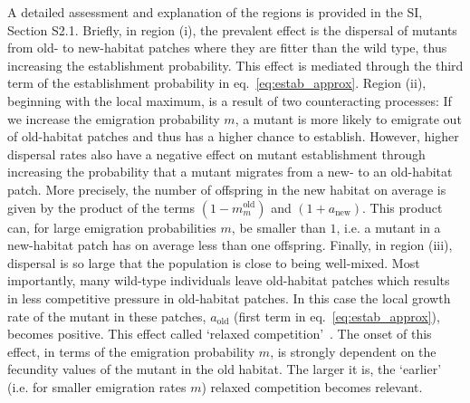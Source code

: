 \documentclass[11pt]{article}
\newcommand{\chg}[1]{\textcolor{change}{#1}}
\begin{document}
A detailed assessment and explanation of the regions is provided in the SI, Section S2.1. Briefly, in region (i), the prevalent effect is the dispersal of mutants from old- to new-habitat patches where they are fitter than the wild type, thus increasing the establishment probability. This effect is mediated through the third term of the establishment probability in eq.~\eqref{eq:estab_approx}. 
Region (ii), beginning with the local maximum, is a result of two counteracting processes: %
\chg{If we increase the emigration probability $m$, a mutant is more likely to emigrate out of old-habitat patches and thus has a higher chance to establish. However, higher dispersal rates also have a negative effect on mutant establishment through \linelabel{R2-32}increasing the probability that a mutant migrates from a new- to an old-habitat patch. More precisely, the number of offspring in the new habitat on average is given by the product of the terms $(1-m_m^{\text{old}})$ and $(1+a_{\text{new}})$. This product can, for large emigration probabilities $m$, be smaller than $1$, i.e. a mutant in a new-habitat patch has on average less than one offspring. Finally, in region (iii), dispersal is so large that the population is close to being well-mixed. Most importantly, many wild-type individuals leave old-habitat patches which results in less competitive pressure in old-habitat patches. In this case the local growth rate of the mutant in these patches, $a_{\text{old}}$ (first term in eq.~\eqref{eq:estab_approx}), becomes positive. This effect called `relaxed competition'~\citep{uecker_2014}. The onset of this effect, in terms of the emigration probability $m$, is strongly dependent on the fecundity values of the mutant in the old habitat. The larger it is, the `earlier' (i.e. for smaller emigration rates $m$) relaxed competition becomes relevant.} 


 
\end{document}
